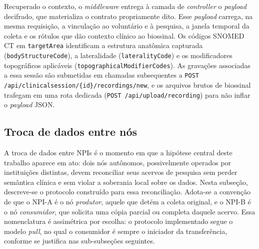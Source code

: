Recuperado o contexto, o \textit{middleware} entrega à camada de \textit{controller} o \textit{payload} decifrado, que materializa o contrato propriamente dito. Esse \textit{payload} carrega, na mesma requisição, a vinculação ao voluntário e à pesquisa, a janela temporal da coleta e os rótulos que dão contexto clínico ao biossinal. Os códigos SNOMED CT em \texttt{targetArea} identificam a estrutura anatômica capturada (\texttt{bodyStructureCode}), a lateralidade (\texttt{lateralityCode}) e os modificadores topográficos aplicáveis (\texttt{topographicalModifierCodes}). As gravações associadas a essa sessão são submetidas em chamadas subsequentes a \texttt{POST /api/clinicalsession/\{id\}/recordings/new}, e os arquivos brutos de biossinal trafegam em uma rota dedicada (\texttt{POST /api/upload/recording}) para não inflar o \textit{payload} JSON.

\subsection{Troca de dados entre nós}\label{subsec:NPITrocaDados}

A troca de dados entre NPIs é o momento em que a hipótese central deste trabalho aparece em ato: dois nós autônomos, possivelmente operados por instituições distintas, devem reconciliar seus acervos de pesquisa sem perder semântica clínica e sem violar a soberania local sobre os dados. Nesta subseção, descreve-se o protocolo construído para essa reconciliação. Adota-se a convenção de que o NPI-A é o nó \textit{produtor}, aquele que detém a coleta original, e o NPI-B é o nó \textit{consumidor}, que solicita uma cópia parcial ou completa daquele acervo. Essa nomenclatura é assimétrica por escolha: o protocolo implementado segue o modelo \textit{pull}, no qual o consumidor é sempre o iniciador da transferência, conforme se justifica nas sub-subseções seguintes.

